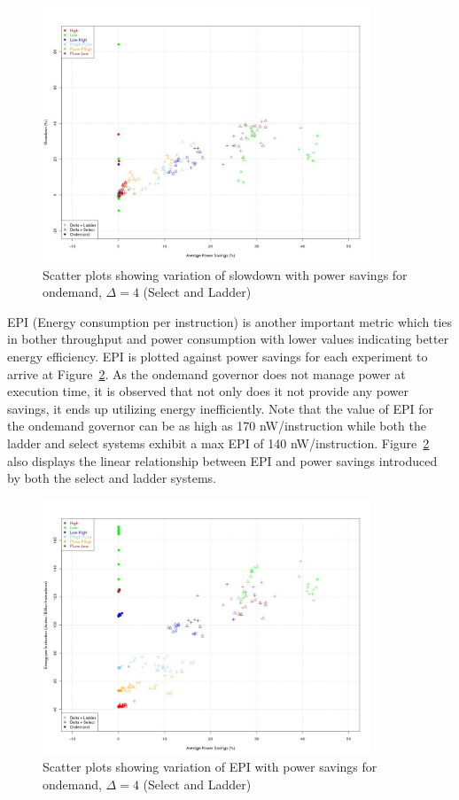 \begin{figure}[h!]
  \begin{center}
    \includegraphics[height=3.0in]{figures/pwr_vs_slowdown_delta_4.jpg}%
    \caption{Scatter plots showing variation of slowdown with power savings for ondemand, $\Delta=4$ (Select and Ladder)}
    \label{fig:pwr_vs_slowdown}
  \end{center}
\end{figure}

EPI (Energy consumption per instruction) is another important metric which ties in bother throughput and power
consumption with lower values indicating better energy efficiency. EPI is plotted 
against power savings for each experiment to arrive at Figure~\ref{fig:pwr_vs_jpbi}. As the ondemand governor
does not manage power at execution time, it is observed that not only does it not provide any power savings, 
it ends up utilizing energy inefficiently. Note that the value of EPI for the ondemand governor can be as high
as 170 nW/instruction while both the ladder and select systems exhibit a max EPI of 140 nW/instruction. 
Figure~\ref{fig:pwr_vs_jpbi} also displays the linear relationship between EPI and power savings introduced
by both the select and ladder systems.

\begin{figure}[h!]
  \begin{center}
    \includegraphics[height=3.0in]{figures/pwr_vs_jpbi_delta_4.jpg}%
    \caption{Scatter plots showing variation of EPI with power savings for ondemand, $\Delta=4$ (Select and Ladder)}
    \label{fig:pwr_vs_jpbi}
  \end{center}
\end{figure}


